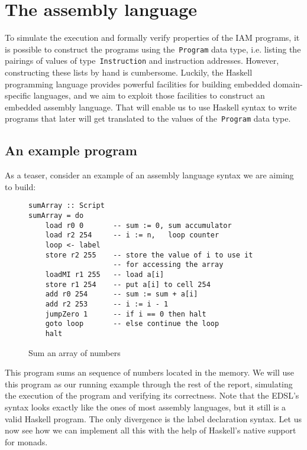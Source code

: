 
\section{The assembly language}

To simulate the execution and formally verify properties of the IAM programs,
it is possible to construct the programs using the~\texttt{Program} data type, i.e.
listing the pairings of values of type~\texttt{Instruction} and instruction addresses.
However, constructing these lists by hand is cumbersome. Luckily, the Haskell programming
language provides powerful facilities for building embedded domain-specific languages, and
we aim to exploit those facilities to construct an embedded assembly language.
That will enable us to use Haskell syntax to write programs that later will get translated
to the values of the~\texttt{Program} data type.

\subsection{An example program}

As a teaser, consider an example of an assembly language syntax we are aiming to build:

\begin{figure}[H]
\begin{verbatim}
sumArray :: Script
sumArray = do
    load r0 0       -- sum := 0, sum accumulator
    load r2 254     -- i := n,   loop counter
    loop <- label
    store r2 255    -- store the value of i to use it
                    -- for accessing the array
    loadMI r1 255   -- load a[i]
    store r1 254    -- put a[i] to cell 254
    add r0 254      -- sum := sum + a[i]
    add r2 253      -- i := i - 1
    jumpZero 1      -- if i == 0 then halt
    goto loop       -- else continue the loop
    halt
\end{verbatim}
\caption{Sum an array of numbers}
\label{syntaxExample}
\end{figure}

This program sums an sequence of numbers located in the memory. We will use this program as
our running example through the rest of the report, simulating the execution of the program
and verifying its correctness. Note that the EDSL's syntax looks exactly like the ones of most
assembly languages, but it still is a valid Haskell program. The only
divergence is the label declaration syntax. Let us now see how we can implement
all this with the help of Haskell's native support for monads.

